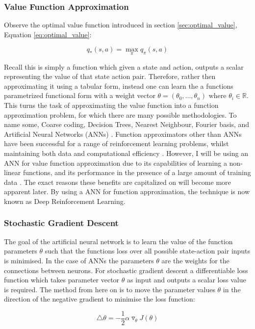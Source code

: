 \documentclass[../dissertation.tex]{subfiles}
\begin{document}
\subsubsection{Value Function Approximation}
Observe the optimal value function introduced in section \ref{sec:optimal_value}, Equation \ref{eq:optimal_value}:

$$ q_*(s,a) = \max_\pi q_\pi(s,a)$$

Recall this is simply a function which given a state and action, outputs a scalar representing the value of that state action pair. Therefore, rather then approximating it using a tabular form, instead one can learn the a functions parametrized functional form with a weight vector $\theta = (\theta_0, ..., \theta_n) \text{ where } \theta_i \in \mathbb{R}$. This turns the task of approximating the value function into a function approximation problem, for which there are many possible methodologies. To name some, Coarse coding, Decision Trees, Nearest Neighbour, Fourier basis, and Artificial Neural Networks (ANNs) \cite{sutton2011reinforcement}. Function approximators other than ANNs have been successful for a range of reinforcement learning problems, whilst maintaining both data and computational efficiency \cite{sutton1996generalization, konidaris2011value, uther1998tree}. However, I will be using an ANN for value function approximation due to its capabilities of learning a non-linear functions, and its performance in the presence of a large amount of training data \cite{lecun2015deep}. The exact reasons these benefits are capitalized on will become more apparent later. By using a ANN for function approximation, the technique is now known as Deep Reinforcement Learning.

\subsubsection{Stochastic Gradient Descent}
The goal of the artificial neural network is to learn the value of the function parameters $\theta$ such that the functions loss over all possible state-action pair inputs is minimised. In the case of ANNs the parameters $\theta$ are the weights for the connections between neurons. For stochastic gradient descent a differentiable loss function which takes parameter vector $\theta$ as input and outputs a scalar loss value is required. The method from here on is to move the parameter values $\theta$ in the direction of the negative gradient to minimise the loss function:

$$ \triangle \theta = -\frac{1}{2} \alpha \triangledown_\theta J(\theta)$$
\end{document}

